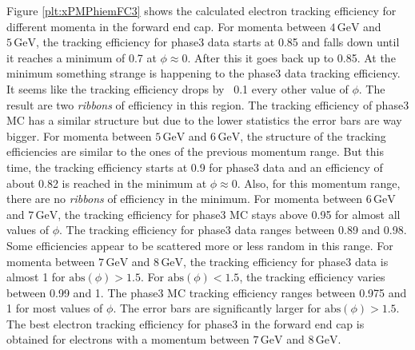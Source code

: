 \documentclass[a4paper,11pt,twosided,final,german,openbib,pdftex,listof=totoc,bibliography=totoc]{scrbook}
\begin{document}
Figure \ref{plt:xPMPhiemFC3} shows the calculated electron tracking efficiency for different momenta in the forward end cap.
For momenta between $4\,\textrm{GeV}$ and $5\,\textrm{GeV}$, the tracking efficiency for phase3 data starts at 0.85 and falls down until it reaches a minimum of 0.7 at $\phi \approx 0$. After this it goes back up to 0.85. At the minimum something strange is happening to the phase3 data tracking efficiency. It seems like the tracking efficiency drops by ~0.1 every other value of $\phi$. The result are two \textit{ribbons} of efficiency in this region. The tracking efficiency of phase3 MC has a similar structure but due to the lower statistics the error bars are way bigger.
For momenta between $5\,\textrm{GeV}$ and $6\,\textrm{GeV}$, the structure of the tracking efficiencies are similar to the ones of the previous momentum range. But this time, the tracking efficiency starts at 0.9 for phase3 data and an efficiency of about 0.82 is reached in the minimum at $\phi \approx 0$. Also, for this momentum range, there are no \textit{ribbons} of efficiency in the minimum.
For momenta between $6\,\textrm{GeV}$ and $7\,\textrm{GeV}$, the tracking efficiency for phase3 MC stays above 0.95 for almost all values of $\phi$. The tracking efficiency for phase3 data ranges between 0.89 and 0.98. Some efficiencies appear to be scattered more or less random in this range.
For momenta between $7\,\textrm{GeV}$ and $8\,\textrm{GeV}$, the tracking efficiency for phase3 data is almost 1 for $\textrm{abs}(\phi) > 1.5$. For $\textrm{abs}(\phi) < 1.5$, the tracking efficiency varies between 0.99 and 1. The phase3 MC tracking efficiency ranges between 0.975 and 1 for most values of $\phi$. The error bars are significantly larger for $\textrm{abs}(\phi) > 1.5$.
The best electron tracking efficiency for phase3 in the forward end cap is obtained for electrons with a momentum between $7\,\textrm{GeV}$ and $8\,\textrm{GeV}$.
\end{document}
